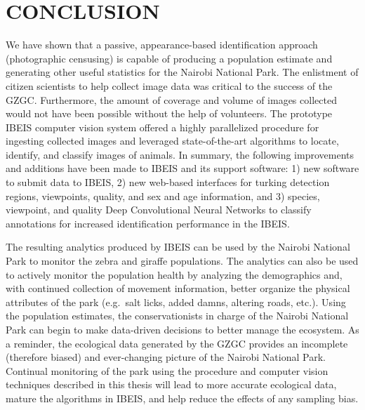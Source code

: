 
\chapter{CONCLUSION} \label{sec:conclusion}

We have shown that a passive, appearance-based identification approach (photographic censusing) is capable of producing a population estimate and generating other useful statistics for the Nairobi National Park.  The enlistment of citizen scientists to help collect image data was critical to the success of the GZGC.   Furthermore, the amount of coverage and volume of images collected would not have been possible without the help of volunteers. The prototype IBEIS computer vision system offered a highly parallelized procedure for ingesting collected images and leveraged state-of-the-art algorithms to locate, identify, and classify images of animals.  In summary, the following improvements and additions have been made to IBEIS and its support software: 1) new software to submit data to IBEIS, 2) new web-based interfaces for turking detection regions, viewpoints, quality, and sex and age information, and 3) species, viewpoint, and quality Deep Convolutional Neural Networks to classify annotations for increased identification performance in the IBEIS.

The resulting analytics produced by IBEIS can be used by the Nairobi National Park to monitor the zebra and giraffe populations.  The analytics can also be used to actively monitor the population health by analyzing the demographics and, with continued collection of movement information, better organize the physical attributes of the park (e.g.\ salt licks, added damns, altering roads, etc.).  Using the population estimates, the conservationists in charge of the Nairobi National Park can begin to make data-driven decisions to better manage the ecosystem.  As a reminder, the ecological data generated by the GZGC provides an incomplete (therefore biased) and ever-changing picture of the Nairobi National Park.  Continual monitoring of the park using the procedure and computer vision techniques described in this thesis will lead to more accurate ecological data, mature the algorithms in IBEIS, and help reduce the effects of any sampling bias.

